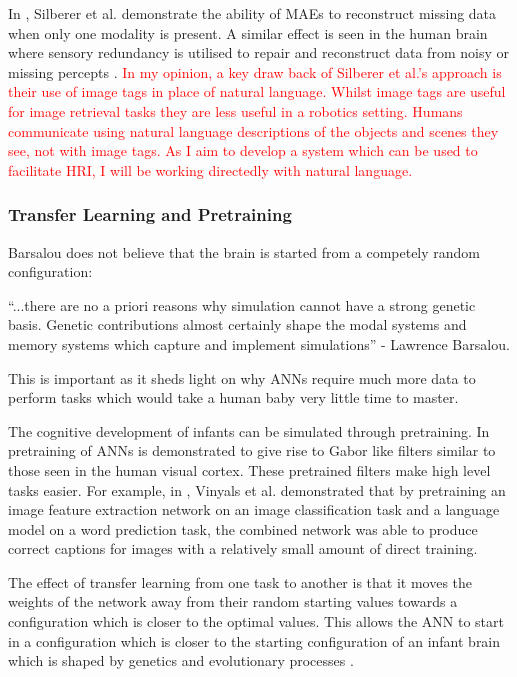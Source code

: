 In \cite{silberer2014learning}, Silberer et al. demonstrate the ability of \acp{MAE} to reconstruct missing data when only one modality is present. A similar effect is seen in the human brain where sensory redundancy is utilised to repair and reconstruct data from noisy or missing percepts \cite{samuel1997lexical}.  \textcolor{red}{In my opinion, a key draw back of Silberer et al.'s approach is their use of image tags in place of natural language. Whilst image tags are useful for image retrieval tasks they are less useful in a robotics setting. Humans communicate using natural language descriptions of the objects and scenes they see, not with image tags. As I aim to develop a system which can be used to facilitate \acl{HRI}, I will be working directedly with natural language.}  

\subsubsection{Transfer Learning and Pretraining}

Barsalou \cite{barsalou2008grounded} does not believe that the brain is started from a competely random configuration:
\begin{displayquote}
``...there are no a priori reasons why simulation cannot have a strong genetic basis. Genetic contributions almost certainly shape the modal systems and memory systems which capture and implement simulations'' - Lawrence Barsalou.
\end{displayquote}

This is important as it sheds light on why \acp{ANN} require much more data to perform tasks which would take a human baby very little time to master. 

The cognitive development of infants can be simulated through pretraining. In \cite{lee2008sparse} pretraining of \acp{ANN} is demonstrated to give rise to Gabor like filters similar to those seen in the human visual cortex. These pretrained filters make high level tasks easier. For example, in \cite{vinyals2015show}, Vinyals et al. demonstrated that by pretraining an image feature extraction network on an image classification task and a language model on a word prediction task, the combined network was able to produce correct captions for images with a  relatively small amount of direct training. 

The effect of transfer learning from one task to another is that it moves the weights of the network away from their random starting values towards a configuration which is closer to the optimal values. This allows the \ac{ANN} to start in a configuration which is closer to the starting configuration of an infant brain which is shaped by genetics and evolutionary processes \cite{barsalou2008grounded}.


